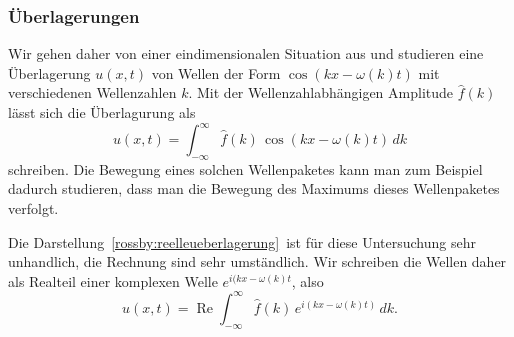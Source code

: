 \subsubsection{Überlagerungen}
Wir gehen daher von einer eindimensionalen Situation aus und studieren
eine Überlagerung $u(x,t)$ von Wellen der Form $\cos(kx-\omega(k) t)$
mit verschiedenen Wellenzahlen $k$.
Mit der Wellenzahlabhängigen Amplitude $\hat f(k)$ lässt sich die
Überlagurung als
\begin{equation}
u(x,t)
=
\int_{-\infty}^\infty \hat f(k)\,\cos(kx-\omega(k)t)\,dk
\label{rossby:reelleueberlagerung}
\end{equation}
schreiben.
Die Bewegung eines solchen Wellenpaketes kann man zum Beispiel
dadurch studieren, dass man die Bewegung des Maximums dieses 
Wellenpaketes verfolgt.

Die Darstellung~\eqref{rossby:reelleueberlagerung} ist für diese
Untersuchung sehr unhandlich, die Rechnung sind sehr umständlich.
Wir schreiben die Wellen daher als Realteil einer komplexen
Welle $e^{i(kx-\omega(k)t}$, also
\begin{equation}
u(x,t)
=
\operatorname{Re}
\int_{-\infty}^\infty \hat f(k)\,e^{i(kx-\omega(k)t)}\,dk.
\label{rossby:komplexeueberlagerung}
\end{equation}

